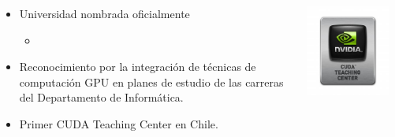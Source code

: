 \frame
{
\frametitle{}
\begin{columns}
    \begin{column}{0.65\textwidth}
        \begin{itemize}
            \item Universidad nombrada oficialmente
            \begin{itemize}
                \item {}
            \end{itemize}
            \item Reconocimiento por la integración de técnicas de computación GPU en planes de estudio de las carreras del Departamento de Informática.
            \item Primer CUDA Teaching Center en Chile.
        \end{itemize}
    \end{column}
    \begin{column}{0.35\textwidth}
        \begin{center}
            \includegraphics[width=0.9\textwidth]{img/cuda_teaching}
        \end{center}
    \end{column}
\end{columns}
}
